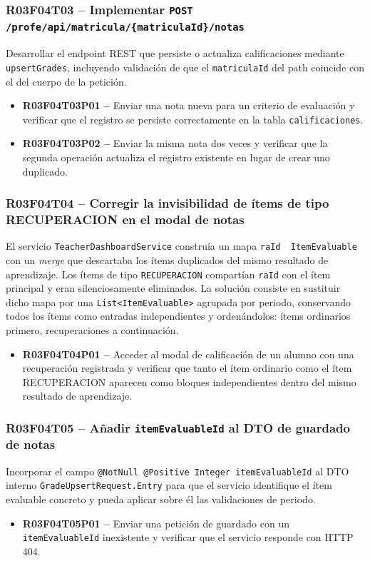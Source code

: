 \documentclass[12pt, a4paper]{report}
\begin{document}
\subsubsection{R03F04T03 -- Implementar \texttt{POST /profe/api/matricula/\{matriculaId\}/notas}}
Desarrollar el endpoint REST que persiste o actualiza calificaciones mediante \texttt{upsertGrades}, incluyendo validación de que el \texttt{matriculaId} del path coincide con el del cuerpo de la petición.
\begin{itemize}
  \item \textbf{R03F04T03P01 --} Enviar una nota nueva para un criterio de evaluación y verificar que el registro se persiste correctamente en la tabla \texttt{calificaciones}.
  \item \textbf{R03F04T03P02 --} Enviar la misma nota dos veces y verificar que la segunda operación actualiza el registro existente en lugar de crear uno duplicado.
\end{itemize}

\subsubsection{R03F04T04 -- Corregir la invisibilidad de ítems de tipo RECUPERACION en el modal de notas}
El servicio \texttt{TeacherDashboardService} construía un mapa \texttt{raId\,\textrightarrow\,ItemEvaluable} con un \textit{merge} que descartaba los ítems duplicados del mismo resultado de aprendizaje. Los ítems de tipo \texttt{RECUPERACION} compartían \texttt{raId} con el ítem principal y eran silenciosamente eliminados. La solución consiste en sustituir dicho mapa por una \texttt{List<ItemEvaluable>} agrupada por periodo, conservando todos los ítems como entradas independientes y ordenándolos: ítems ordinarios primero, recuperaciones a continuación.
\begin{itemize}
  \item \textbf{R03F04T04P01 --} Acceder al modal de calificación de un alumno con una recuperación registrada y verificar que tanto el ítem ordinario como el ítem RECUPERACION aparecen como bloques independientes dentro del mismo resultado de aprendizaje.
\end{itemize}

\subsubsection{R03F04T05 -- Añadir \texttt{itemEvaluableId} al DTO de guardado de notas}
Incorporar el campo \texttt{@NotNull @Positive Integer itemEvaluableId} al DTO interno \texttt{GradeUpsertRequest.Entry} para que el servicio identifique el ítem evaluable concreto y pueda aplicar sobre él las validaciones de periodo.
\begin{itemize}
  \item \textbf{R03F04T05P01 --} Enviar una petición de guardado con un \texttt{itemEvaluableId} inexistente y verificar que el servicio responde con HTTP 404.
\end{itemize}
\end{document}
